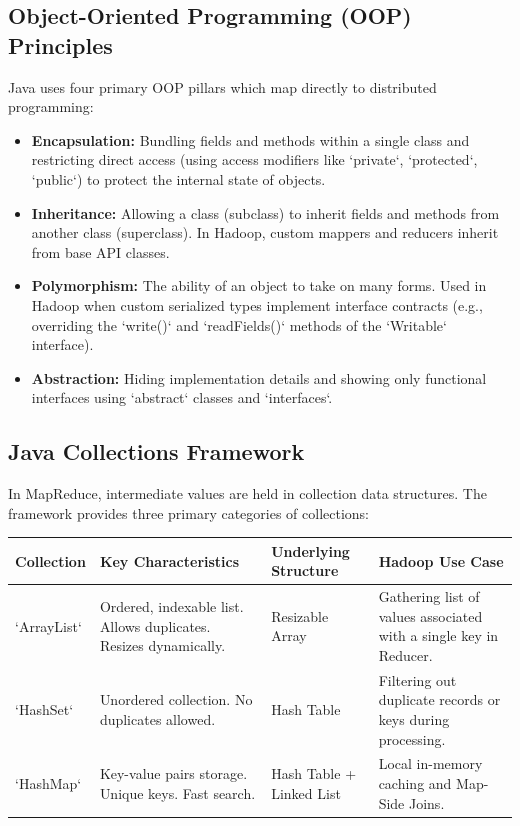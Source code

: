 \documentclass[12pt,a4paper]{article}
\renewcommand{\arraystretch}{1.45}
\begin{document}
\subsection{Object-Oriented Programming (OOP) Principles}
Java uses four primary OOP pillars which map directly to distributed programming:
\begin{itemize}[leftmargin=*, itemsep=3pt]
  \item \textbf{Encapsulation:} Bundling fields and methods within a single class and restricting direct access (using access modifiers like `private`, `protected`, `public`) to protect the internal state of objects.
  \item \textbf{Inheritance:} Allowing a class (subclass) to inherit fields and methods from another class (superclass). In Hadoop, custom mappers and reducers inherit from base API classes.
  \item \textbf{Polymorphism:} The ability of an object to take on many forms. Used in Hadoop when custom serialized types implement interface contracts (e.g., overriding the `write()` and `readFields()` methods of the `Writable` interface).
  \item \textbf{Abstraction:} Hiding implementation details and showing only functional interfaces using `abstract` classes and `interfaces`.
\end{itemize}

\subsection{Java Collections Framework}
In MapReduce, intermediate values are held in collection data structures. The framework provides three primary categories of collections:

\par\vspace{6pt}\noindent
{\renewcommand{\arraystretch}{1.4}%
\begin{tabularx}{\linewidth}{|B{3.0cm}|Y|B{3.2cm}|Y|}
\hline
\textbf{Collection} & \textbf{Key Characteristics} & \textbf{Underlying Structure} & \textbf{Hadoop Use Case} \\
\hline
`ArrayList` & Ordered, indexable list. Allows duplicates. Resizes dynamically. & Resizable Array & Gathering list of values associated with a single key in Reducer. \\
\hline
`HashSet` & Unordered collection. No duplicates allowed. & Hash Table & Filtering out duplicate records or keys during processing. \\
\hline
`HashMap` & Key-value pairs storage. Unique keys. Fast search. & Hash Table + Linked List & Local in-memory caching and Map-Side Joins. \\
\hline
\end{tabularx}}
\end{document}
